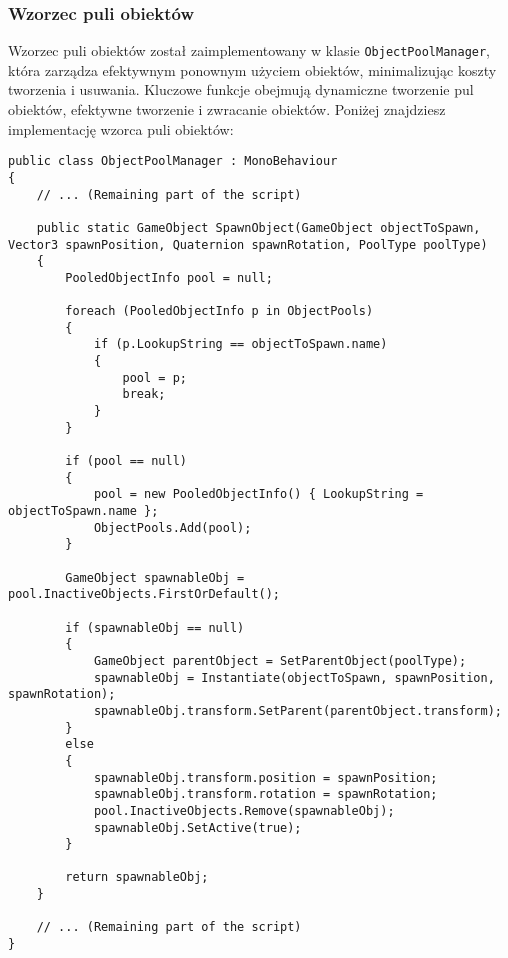 \subsubsection{Wzorzec puli obiektów} \label{subsubsec:objPoolPattern}
Wzorzec puli obiektów został zaimplementowany w klasie \texttt{ObjectPoolManager}, która zarządza efektywnym ponownym użyciem obiektów, minimalizując koszty tworzenia i usuwania. Kluczowe funkcje obejmują dynamiczne tworzenie pul obiektów, efektywne tworzenie i zwracanie obiektów. Poniżej znajdziesz implementację wzorca puli obiektów:
\begin{codebox}
\begin{lstlisting}[language={[Sharp]C}]
public class ObjectPoolManager : MonoBehaviour
{
    // ... (Remaining part of the script)

    public static GameObject SpawnObject(GameObject objectToSpawn, Vector3 spawnPosition, Quaternion spawnRotation, PoolType poolType)
    {
        PooledObjectInfo pool = null;
        
        foreach (PooledObjectInfo p in ObjectPools)
        {
            if (p.LookupString == objectToSpawn.name)
            {
                pool = p;
                break;
            }
        }
        
        if (pool == null)
        {
            pool = new PooledObjectInfo() { LookupString = objectToSpawn.name };
            ObjectPools.Add(pool);
        }
        
        GameObject spawnableObj = pool.InactiveObjects.FirstOrDefault();
        
        if (spawnableObj == null)
        {
            GameObject parentObject = SetParentObject(poolType);
            spawnableObj = Instantiate(objectToSpawn, spawnPosition, spawnRotation);
            spawnableObj.transform.SetParent(parentObject.transform);
        }
        else
        {
            spawnableObj.transform.position = spawnPosition;
            spawnableObj.transform.rotation = spawnRotation;
            pool.InactiveObjects.Remove(spawnableObj);
            spawnableObj.SetActive(true);
        }
        
        return spawnableObj;
    }

    // ... (Remaining part of the script)
}
\end{lstlisting}
\end{codebox}
